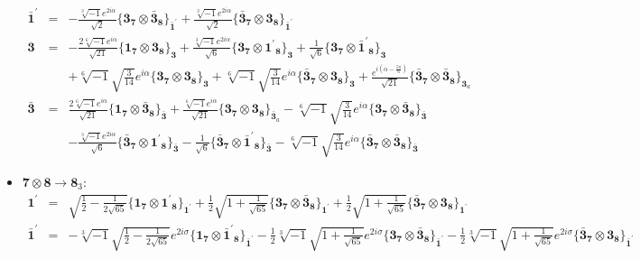 \documentclass[english]{article}
\newcommand{\subcg}[3]{\big\{ {#1}\otimes{#2}\big\}^{}_{#3}}
\newcommand{\rep}[1]{\mathbf{#1}}
\begin{document}
\begin{itemize}
\begin{eqnarray*}
\\
\rep{\bar{1}^{\prime}} &=& -\frac{\sqrt[3]{-1} e^{2 i \alpha }}{\sqrt{2}}\subcg{\rep{3}_{\rep{7}}}{\rep{\bar{3}}_{\rep{8}}}{\rep{\bar{1}^{\prime}}}+\frac{\sqrt[3]{-1} e^{2 i \alpha }}{\sqrt{2}}\subcg{\rep{\bar{3}}_{\rep{7}}}{\rep{3}_{\rep{8}}}{\rep{\bar{1}^{\prime}}}
\\
\rep{3} &=& -\frac{2 \sqrt[6]{-1} e^{i \alpha }}{\sqrt{21}}\subcg{\rep{1}_{\rep{7}}}{\rep{3}_{\rep{8}}}{\rep{3}}+\frac{\sqrt[3]{-1} e^{2 i \alpha }}{\sqrt{6}}\subcg{\rep{3}_{\rep{7}}}{\rep{1^{\prime}}_{\rep{8}}}{\rep{3}}+\frac{1}{\sqrt{6}}\subcg{\rep{3}_{\rep{7}}}{\rep{\bar{1}^{\prime}}_{\rep{8}}}{\rep{3}} \\ 
 & & +\sqrt[6]{-1} \sqrt{\frac{3}{14}} e^{i \alpha }\subcg{\rep{3}_{\rep{7}}}{\rep{3}_{\rep{8}}}{\rep{3}}+\sqrt[6]{-1} \sqrt{\frac{3}{14}} e^{i \alpha }\subcg{\rep{\bar{3}}_{\rep{7}}}{\rep{3}_{\rep{8}}}{\rep{3}}+\frac{e^{i \left(\alpha -\frac{5 \pi }{6}\right)}}{\sqrt{21}}\subcg{\rep{\bar{3}}_{\rep{7}}}{\rep{\bar{3}}_{\rep{8}}}{\rep{3}_{a}}
\\
\rep{\bar{3}} &=& \frac{2 \sqrt[6]{-1} e^{i \alpha }}{\sqrt{21}}\subcg{\rep{1}_{\rep{7}}}{\rep{\bar{3}}_{\rep{8}}}{\rep{\bar{3}}}+\frac{\sqrt[6]{-1} e^{i \alpha }}{\sqrt{21}}\subcg{\rep{3}_{\rep{7}}}{\rep{3}_{\rep{8}}}{\rep{\bar{3}}_{a}}-\sqrt[6]{-1} \sqrt{\frac{3}{14}} e^{i \alpha }\subcg{\rep{3}_{\rep{7}}}{\rep{\bar{3}}_{\rep{8}}}{\rep{\bar{3}}} \\ 
 & & -\frac{\sqrt[3]{-1} e^{2 i \alpha }}{\sqrt{6}}\subcg{\rep{\bar{3}}_{\rep{7}}}{\rep{1^{\prime}}_{\rep{8}}}{\rep{\bar{3}}}-\frac{1}{\sqrt{6}}\subcg{\rep{\bar{3}}_{\rep{7}}}{\rep{\bar{1}^{\prime}}_{\rep{8}}}{\rep{\bar{3}}}-\sqrt[6]{-1} \sqrt{\frac{3}{14}} e^{i \alpha }\subcg{\rep{\bar{3}}_{\rep{7}}}{\rep{\bar{3}}_{\rep{8}}}{\rep{\bar{3}}}
\end{eqnarray*}
\item $\rep{7}\otimes\rep{8}\to\rep{8}_{3}$:
\begin{eqnarray*}
\rep{1^{\prime}} &=& \sqrt{\frac{1}{2}-\frac{1}{2 \sqrt{65}}}\subcg{\rep{1}_{\rep{7}}}{\rep{1^{\prime}}_{\rep{8}}}{\rep{1^{\prime}}}+\frac{1}{2} \sqrt{1+\frac{1}{\sqrt{65}}}\subcg{\rep{3}_{\rep{7}}}{\rep{\bar{3}}_{\rep{8}}}{\rep{1^{\prime}}}+\frac{1}{2} \sqrt{1+\frac{1}{\sqrt{65}}}\subcg{\rep{\bar{3}}_{\rep{7}}}{\rep{3}_{\rep{8}}}{\rep{1^{\prime}}}
\\
\rep{\bar{1}^{\prime}} &=& -\sqrt[3]{-1} \sqrt{\frac{1}{2}-\frac{1}{2 \sqrt{65}}} e^{2 i \sigma }\subcg{\rep{1}_{\rep{7}}}{\rep{\bar{1}^{\prime}}_{\rep{8}}}{\rep{\bar{1}^{\prime}}}-\frac{1}{2} \sqrt[3]{-1} \sqrt{1+\frac{1}{\sqrt{65}}} e^{2 i \sigma }\subcg{\rep{3}_{\rep{7}}}{\rep{\bar{3}}_{\rep{8}}}{\rep{\bar{1}^{\prime}}}-\frac{1}{2} \sqrt[3]{-1} \sqrt{1+\frac{1}{\sqrt{65}}} e^{2 i \sigma }\subcg{\rep{\bar{3}}_{\rep{7}}}{\rep{3}_{\rep{8}}}{\rep{\bar{1}^{\prime}}}

\end{eqnarray*}
\end{itemize}
\end{document}

